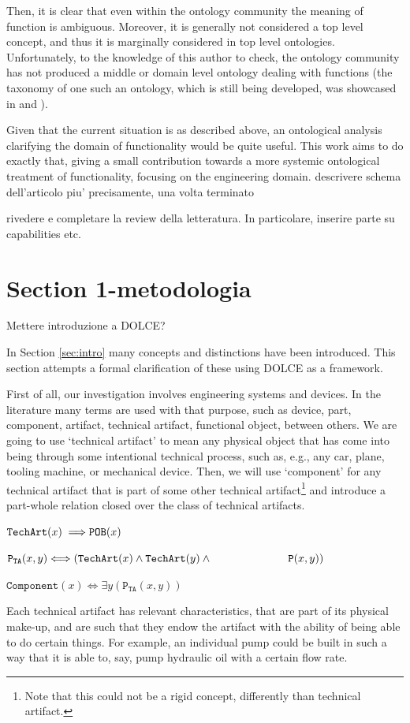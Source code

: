 \documentclass[crcready]{iosart2x}
\newcommand{\bflist}{\begin{list}{}{\setlength{\topsep}{2mm}\setlength{\partopsep}{0mm}\setlength{\parsep}{0mm}\setlength{\leftmargin}{9mm}\setlength{\labelwidth}{8mm}}}
\newcommand{\eflist}{\end{list}}
\newcommand{\AxLabel}{\textrm{a}}
\newcommand{\DefLabel}{\textrm{d}}
\newcounter{cntax}
\newcommand{\myax}[1]{\refstepcounter{cntax}\begin{small}{\bf \AxLabel\thecntax\label{ax:#1}}\end{small}}
\newcounter{cntdef}
\newcommand{\mydf}[1]{\refstepcounter{cntdef}\begin{small}{\bf \DefLabel\thecntdef\label{def:#1}}\end{small}}
\newcommand{\generalStyle}[1]{\texttt{#1}}
\newcommand{\biRel}[3]{\generalStyle{#1}(#2,#3)}
\newcommand{\uniRel}[2]{\generalStyle{#1}(#2)}
\newcommand{\biRelPar}[4]{\generalStyle{#1}_{\generalStyle{#4}}(#2,#3)}
\newcommand{\myiff}{\Longleftrightarrow}
\newcommand{\myfi}{\hspace{0.9mm} \Longrightarrow}
\newcommand{\DOLCE}{\textsc{DOLCE}\xspace} %
\newcommand{\DOLCEPart}[2]{\biRel{{P}}{#1}{#2}}
\newcommand{\DOLCEPhysObj}[1]{\uniRel{{POB}}{#1}}
\newcommand{\TechArt}[1]{\uniRel{TechArt}{#1}}
\newcommand{\Component}[1]{\uniRel{Component}{#1}}
\newcommand{\partTA}[2]{\biRelPar{P}{#1}{#2}{TA}}
\newcommand{\TODO}[1]{{\color{red} #1}}
\begin{document}
 Then, it is clear that even within the ontology community the meaning of function is ambiguous. Moreover, it is generally not considered 
 a top level concept, and thus it is marginally considered in top level ontologies. Unfortunately, to the knowledge of this author \TODO{to check}, the ontology community 
 has not produced a middle or domain level ontology dealing with functions (the taxonomy of one such an ontology, which is still being developed, was showcased in \cite{borgoCapabilitiesCapacitiesFunctionalities2021} and \cite{borgoKnowledgebasedAdaptiveAgents2019}).  

Given that the current situation is as described above, 
an ontological analysis clarifying the domain of functionality would be quite useful.
This work aims to do exactly that, giving a small contribution towards a more systemic ontological treatment of functionality, focusing on the engineering domain.
\TODO{descrivere schema dell'articolo piu' precisamente, una volta terminato}

\TODO{rivedere e completare la review della letteratura. In particolare, inserire parte su capabilities etc.}

\section{\TODO{Section 1-metodologia}}\label{sec:...}
\TODO{Mettere introduzione a DOLCE?}

In Section \ref{sec:intro} many concepts and distinctions have been introduced. This section attempts a formal clarification of these using \DOLCE as a framework. 

First of all, our investigation involves engineering systems and devices. In the literature many terms are used with that purpose, such as device, part, component, artifact, technical artifact, functional object, between others. 
We are going to use `technical artifact' to mean any physical object that has come into being through some intentional technical process, such as, e.g., any car, plane, tooling machine, or mechanical device.
Then, we will use `component' for any technical artifact that is part of some other technical artifact\footnote{Note that this could not be a rigid concept, differently than technical artifact.} and introduce a part-whole relation closed over the class of technical artifacts.
\bflist
\item[\myax{subsumptionTArt}] $ \TechArt{x} \myfi  \DOLCEPhysObj{x} $ 
\item[\mydf{partTA}] $ \partTA{x}{y} \myiff (\TechArt{x} \land \TechArt{y} \land  \hspace{0.2\textwidth}\DOLCEPart{x}{y})  $
\item[\mydf{comp}] $ \Component{x} \myiff \exists y(\partTA{x}{y}) $
\eflist
Each technical artifact has relevant characteristics, that are part of its physical make-up, and are such that they endow the artifact with the ability of being able to do certain things. 
For example, an individual pump could be built in such a way that it is able to, say, pump hydraulic oil with a certain flow rate.
 
\end{document}
